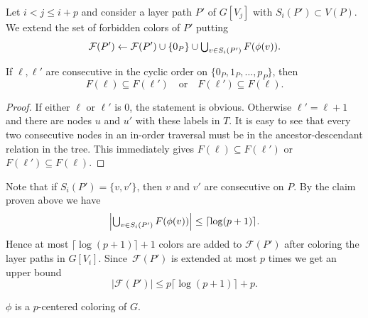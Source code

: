 Let $i<j\leq i+p$ and consider a layer path $P'$ of $G[V_j]$ with 
$S_i(P') \subset V(P)$.
We extend the set of forbidden colors of $P'$ putting
\[
  \mathcal{F}(P') \gets \mathcal{F}(P') \cup \{0_P\} \cup \hbox{$\bigcup_{v\in S_i(P')} F(\phi(v))$}.
\]
 \begin{klaim}\label{claim_inorder}
If $\ell,\ell'$ are consecutive in the cyclic order on $\{0_P,1_P,\ldots,p_P\}$, then
\[F(\ell)\subseteq F(\ell')\quad\textrm{or}\quad F(\ell')\subseteq F(\ell).
\]
 \end{klaim}
\begin{proof}
  If either $\ell$ or $\ell'$ is $0$, the statement is obvious.
  Otherwise $\ell'=\ell+1$ and there are nodes $u$ and $u'$ with these
  labels in $T$. 
  It is easy to see that every two consecutive nodes in an in-order traversal 
  must be in the ancestor-descendant relation in the tree.
  This immediately gives $F(\ell)\subseteq F(\ell')$ or $F(\ell')\subseteq F(\ell)$.
\end{proof}
Note that if $S_i(P')=\{v,v'\}$, then $v$ and $v'$ are consecutive on $P$.
By the claim proven above we have
\[
\left|\hbox{$\bigcup_{v\in S_i(P')} F(\phi(v))$}\right| \leq \lceil\log(p+1)\rceil.
\]
Hence at most $\lceil\log(p+1)\rceil + 1$ colors are added to $\mathcal{F}(P')$
after coloring the layer paths in $G[V_i]$.
Since~$\mathcal{F}(P')$ is extended at most $p$ times we get an upper bound
\[
|\mathcal{F}(P')| \leq p\lceil\log(p+1)\rceil + p.
\]
\begin{klaim}
  $\phi$ is a $p$-centered coloring of $G$.
\end{klaim}
